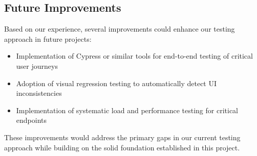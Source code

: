 \subsection{Future Improvements}

Based on our experience, several improvements could enhance our testing approach in future projects:

\begin{itemize}
    \item Implementation of Cypress or similar tools for end-to-end testing of critical user journeys
    \item Adoption of visual regression testing to automatically detect UI inconsistencies
    \item Implementation of systematic load and performance testing for critical endpoints
\end{itemize}

These improvements would address the primary gaps in our current testing approach while building on the solid foundation established in this project.